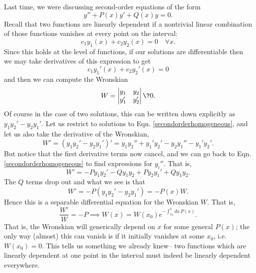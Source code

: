 Last time, we were discussing second-order equations of the form
\begin{equation}
    y'' + P(x) y' + Q(x) y =0.
\end{equation}
Recall that two functions are linearly dependent if a nontrivial linear combination of those functions vanishes at every point on the interval:
\begin{equation}\label{secondorderhomogeneous}
    c_1 y_1(x) +c_2 y_2(x) = 0 \quad\forall x.
\end{equation}
Since this holds at the level of functions, if our solutions are differentiable then we may take derivatives of this expression to get
\begin{equation}
    c_1 y_1'(x) + c_2 y_2'(x) = 0
\end{equation}
and then we can compute the Wronskian
\begin{equation}
    W= \begin{vmatrix}
    y_1 & y_2 \\
    y_1' & y_2'
    \end{vmatrix} \? 0.
\end{equation}
Of course in the case of two solutions, this can be written down explicitly as $y_1 y_2'-y_2 y_1'$. Let us restrict to solutions to Eqn. \ref{secondorderhomogeneous}, and let us also take the derivative of the Wronskian,
\begin{equation}
    W'= (y_1 y_2' - y_2 y_1')' = y_1 y_2'' + y_1' y_2' - y_2 y_1'' - y_1' y_2'.
\end{equation}
But notice that the first derivative terms now cancel, and we can go back to Eqn. \ref{secondorderhomogeneous} to find expressions for $y_i''$. That is,
\begin{equation}
    W' = -P y_1 y_2' - Q y_1 y_2 + P y_2 y_1' + Q y_1 y_2.
\end{equation}
The $Q$ terms drop out and what we see is that
\begin{equation}
    W'=-P(y_1y_2' - y_2y_1') = -P(x) W.
\end{equation}
Hence this is a separable differential equation for the Wronskian $W$. That is,
\begin{equation}
     \frac{W'}{W} = -P \implies W(x) = W(x_0)e^{-\int_{x_0}^x dx\,P(x)}.
\end{equation}
That is, the Wronskian will generically depend on $x$ for some general $P(x)$; the only way (almost) this can vanish is if it initially vanishes at some $x_0$, i.e. $W(x_0)=0$. This tells us something we already knew-- two functions which are linearly dependent at one point in the interval must indeed be linearly dependent everywhere.

